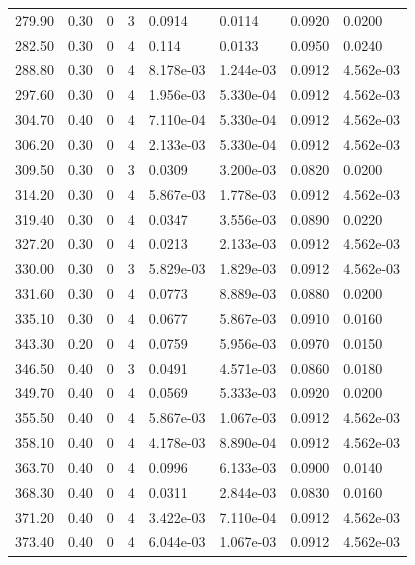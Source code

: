 \documentclass[preview]{standalone}
\begin{document}
{{{\begin{tabular}{L{1.2cm}C{1.2cm} C{0.3cm}C{0.5cm} C{1.4cm}C{1.4cm} C{1.4cm}C{1.4cm}}
  279.90  &  0.30  & 0     &  3 &  0.0914  & 0.0114  & 0.0920 &  0.0200   \\ 
  282.50  &  0.30  & 0     &  4 &  0.114  & 0.0133  & 0.0950 &  0.0240   \\ 
  288.80  &  0.30  & 0     &  4 &  8.178e-03  & 1.244e-03  & 0.0912 &  4.562e-03   \\ 
  297.60  &  0.30  & 0     &  4 &  1.956e-03  & 5.330e-04  & 0.0912 &  4.562e-03   \\ 
  304.70  &  0.40  & 0     &  4 &  7.110e-04  & 5.330e-04  & 0.0912 &  4.562e-03   \\ 
  306.20  &  0.30  & 0     &  4 &  2.133e-03  & 5.330e-04  & 0.0912 &  4.562e-03   \\ 
  309.50  &  0.30  & 0     &  3 &  0.0309  & 3.200e-03  & 0.0820 &  0.0200   \\ 
  314.20  &  0.30  & 0     &  4 &  5.867e-03  & 1.778e-03  & 0.0912 &  4.562e-03   \\ 
  319.40  &  0.30  & 0     &  4 &  0.0347  & 3.556e-03  & 0.0890 &  0.0220   \\ 
  327.20  &  0.30  & 0     &  4 &  0.0213  & 2.133e-03  & 0.0912 &  4.562e-03   \\ 
  330.00  &  0.30  & 0     &  3 &  5.829e-03  & 1.829e-03  & 0.0912 &  4.562e-03   \\ 
  331.60  &  0.30  & 0     &  4 &  0.0773  & 8.889e-03  & 0.0880 &  0.0200   \\ 
  335.10  &  0.30  & 0     &  4 &  0.0677  & 5.867e-03  & 0.0910 &  0.0160   \\ 
  343.30  &  0.20  & 0     &  4 &  0.0759  & 5.956e-03  & 0.0970 &  0.0150   \\ 
  346.50  &  0.40  & 0     &  3 &  0.0491  & 4.571e-03  & 0.0860 &  0.0180   \\ 
  349.70  &  0.40  & 0     &  4 &  0.0569  & 5.333e-03  & 0.0920 &  0.0200   \\ 
  355.50  &  0.40  & 0     &  4 &  5.867e-03  & 1.067e-03  & 0.0912 &  4.562e-03   \\ 
  358.10  &  0.40  & 0     &  4 &  4.178e-03  & 8.890e-04  & 0.0912 &  4.562e-03   \\ 
  363.70  &  0.40  & 0     &  4 &  0.0996  & 6.133e-03  & 0.0900 &  0.0140   \\ 
  368.30  &  0.40  & 0     &  4 &  0.0311  & 2.844e-03  & 0.0830 &  0.0160   \\ 
  371.20  &  0.40  & 0     &  4 &  3.422e-03  & 7.110e-04  & 0.0912 &  4.562e-03   \\ 
  373.40  &  0.40  & 0     &  4 &  6.044e-03  & 1.067e-03  & 0.0912 &  4.562e-03   \\ 

\end{tabular}}}}
\end{document}
